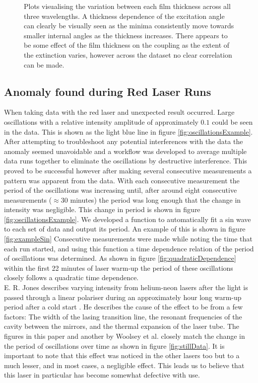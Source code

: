 \documentclass[%
reprint,
amsmath,amssymb,
aps,
]{revtex4-2}
\begin{document}
\begin{figure}
				\caption{\label{fig:thicknessVariation}Plots visualising the variation between each film thickness across all three wavelengths. A thickness dependence of the excitation angle can clearly be visually seen as the minima consistently move towards smaller internal angles as the thickness increases. There appears to be some effect of the film thickness on the coupling as the extent of the extinction varies, however across the dataset no clear correlation can be made.}
			\end{figure}
	
		\subsection{Anomaly found during Red Laser Runs}
			When taking data with the red laser and unexpected result occurred. Large oscillations with a relative intensity amplitude of approximately $0.1$ could be seen in the data. This is shown as the light blue line in figure \ref{fig:oscillationsExample}. After attempting to troubleshoot any potential interferences with the data the anomaly seemed unavoidable and a workflow was developed to average multiple data runs together to eliminate the oscillations by destructive interference. This proved to be successful however after making several consecutive measurements a pattern was apparent from the data. With each consecutive measurement the period of the oscillations was increasing until, after around eight consecutive measurements ($\approx$30 minutes) the period was long enough that the change in intensity was negligible. This change in period is shown in figure \ref{fig:oscillationsExample}. We developed a function to automatically fit a sin wave to each set of data and output its period. An example of this is shown in figure \ref{fig:exampleSin} Consecutive measurements were made while noting the time that each run started, and using this function a time dependence relation of the period of oscillations was determined. As shown in figure \ref{fig:quadraticDependence} within the first 22 minutes of laser warm-up the period of these oscillations closely follows a quadratic time dependence. \\
			
			E. R. Jones describes varying intensity from helium-neon lasers after the light is passed through a linear polariser during an approximately hour long warm-up period after a cold start \cite{jonesPolarisation}. He describes the cause of the effect to be from a few factors: The width of the lasing transition line, the resonant frequencies of the cavity between the mirrors, and the thermal expansion of the laser tube. The figures in this paper and another by Woolsey et al. \cite{woolseyPolarisation} closely match the change in the period of oscillations over time as shown in figure \ref{fig:stillData}. It is important to note that this effect was noticed in the other lasers too but to a much lesser, and in most cases, a negligible effect. This leads us to believe that this laser in particular has become somewhat defective with use.
			
\end{document}
